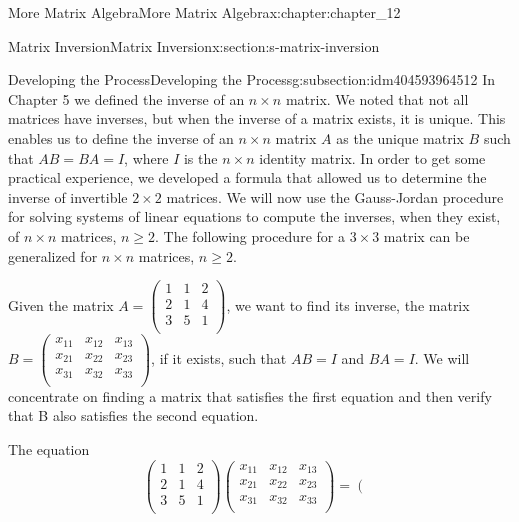 \documentclass[twoside,10pt,]{book}
\numberwithin{equation}{section}
\begin{document}
\begin{chapterptx}{More Matrix Algebra}{}{More Matrix Algebra}{}{}{x:chapter:chapter_12}
\begin{sectionptx}{Matrix Inversion}{}{Matrix Inversion}{}{}{x:section:s-matrix-inversion}
%
\begin{subsectionptx}{Developing the Process}{}{Developing the Process}{}{}{g:subsection:idm404593964512}
In Chapter 5 we defined the inverse of an \(n \times  n\) matrix. We noted that not all matrices have inverses, but when the inverse of a matrix exists, it is unique. This enables us to define the inverse of an \(n \times n\) matrix \(A\) as the unique matrix \(B\) such that \(A B = B A =I\), where \(I\) is the \(n \times  n\) identity matrix. In order to get some practical experience, we developed a formula that allowed us to determine the inverse of invertible \(2\times 2\) matrices. We will now use the Gauss-Jordan procedure for solving systems of linear equations to compute the inverses, when they exist, of \(n\times n\) matrices, \(n \geq  2\). The following procedure for a \(3\times 3\) matrix can be generalized for \(n\times
n\) matrices, \(n\geq 2\).%
\par
Given the matrix \(A = \left(
\begin{array}{ccc}
1 & 1 & 2 \\
2 & 1 & 4 \\
3 & 5 & 1 \\
\end{array}
\right)\), we want to find its inverse, the matrix \(B=\left(
\begin{array}{ccc}
x_{11} & x_{12} & x_{13} \\
x_{21} & x_{22} & x_{23} \\
x_{31} & x_{32} & x_{33} \\
\end{array}
\right)\), if it exists, such that  \(A B = I\) and \(B A = I\). We will concentrate on finding a matrix that satisfies the first equation and then verify that B also satisfies the second equation.%
\par
The equation%
\begin{equation*}
\left(
\begin{array}{ccc}
1 & 1 & 2 \\
2 & 1 & 4 \\
3 & 5 & 1 \\
\end{array}
\right)\left(
\begin{array}{ccc}
x_{11} & x_{12} & x_{13} \\
x_{21} & x_{22} & x_{23} \\
x_{31} & x_{32} & x_{33} \\
\end{array}
\right)= \left(
\begin{array}{ccc}

\end{array}
\end{equation*}
\end{subsectionptx}
\end{sectionptx}
\end{chapterptx}
\end{document}
